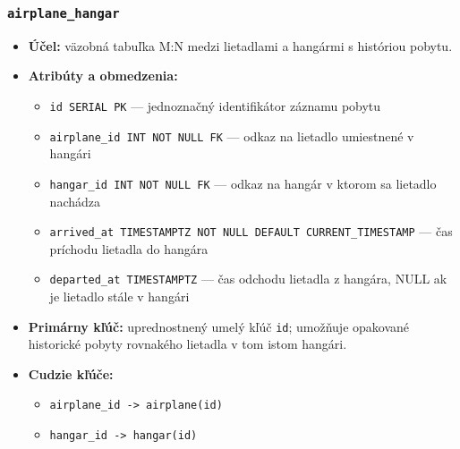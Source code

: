 \documentclass[11pt, a4paper]{article}
\begin{document}
\subsubsection*{\texttt{airplane\_hangar}}
\begin{itemize}
    \item \textbf{Účel:} väzobná tabuľka M:N medzi lietadlami a hangármi s históriou pobytu.
    \item \textbf{Atribúty a obmedzenia:}
    \begin{itemize}
        \item \texttt{id SERIAL PK} --- jednoznačný identifikátor záznamu pobytu
        \item \texttt{airplane\_id INT NOT NULL FK} --- odkaz na lietadlo umiestnené v hangári
        \item \texttt{hangar\_id INT NOT NULL FK} --- odkaz na hangár v ktorom sa lietadlo nachádza
        \item \texttt{arrived\_at TIMESTAMPTZ NOT NULL DEFAULT CURRENT\_TIMESTAMP} --- čas príchodu lietadla do hangára
        \item \texttt{departed\_at TIMESTAMPTZ} --- čas odchodu lietadla z hangára, NULL ak je lietadlo stále v hangári
    \end{itemize}
    \item \textbf{Primárny kľúč:} uprednostnený umelý kľúč \texttt{id}; umožňuje opakované
        historické pobyty rovnakého lietadla v tom istom hangári.
    \item \textbf{Cudzie kľúče:} 
        \begin{itemize}
            \item \texttt{airplane\_id -> airplane(id)}
            \item \texttt{hangar\_id -> hangar(id)}
        \end{itemize}
\end{itemize}
\end{document}
